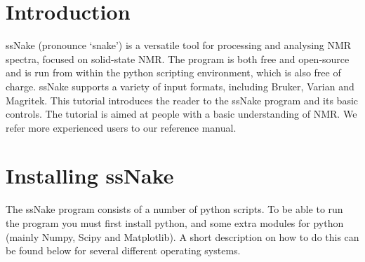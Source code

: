 \documentclass[11pt,a4paper]{article}
\renewcommand\cfttoctitlefont{\color{black!70}\Huge\fontfamily{SourceSansPro-LF}\bfseries}
\begin{document}


\thispagestyle{empty}
\newpage
\mbox{}


\renewcommand\cfttoctitlefont{\color{black}\Huge\fontfamily{SourceSansPro-LF}\bfseries}
\tableofcontents %

\renewcommand\cfttoctitlefont{\color{black!70}\Huge\fontfamily{SourceSansPro-LF}\bfseries}


\section{Introduction}
ssNake (pronounce `snake') is a versatile tool for processing and analysing NMR spectra, focused on solid-state NMR. The program is both free and open-source and is run from within the python scripting environment, which is also free of charge. ssNake supports a variety of input formats, including Bruker, Varian and Magritek. This tutorial introduces the reader to the ssNake program and its basic controls. The tutorial is aimed at people with a basic understanding of NMR. We refer more experienced users to our reference manual.


\section{Installing ssNake}

The ssNake program consists of a number of python scripts. To be able to run the program you must
first install python, and some extra modules for python (mainly Numpy, Scipy and Matplotlib). A
short description on how to do this can be found below for several different operating systems.
\end{document}
